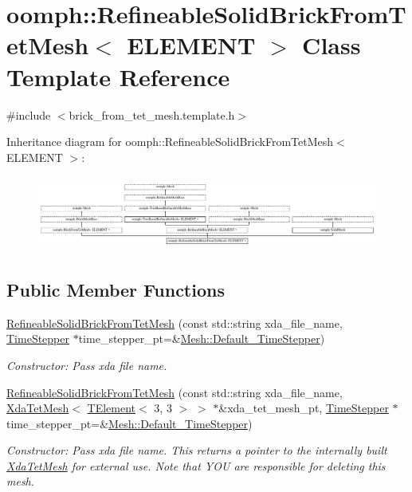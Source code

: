 \hypertarget{classoomph_1_1RefineableSolidBrickFromTetMesh}{}\section{oomph\+:\+:Refineable\+Solid\+Brick\+From\+Tet\+Mesh$<$ E\+L\+E\+M\+E\+NT $>$ Class Template Reference}
\label{classoomph_1_1RefineableSolidBrickFromTetMesh}


{\ttfamily \#include $<$brick\+\_\+from\+\_\+tet\+\_\+mesh.\+template.\+h$>$}

Inheritance diagram for oomph\+:\+:Refineable\+Solid\+Brick\+From\+Tet\+Mesh$<$ E\+L\+E\+M\+E\+NT $>$\+:\begin{figure}[H]
\begin{center}
\leavevmode
\includegraphics[height=2.477876cm]{classoomph_1_1RefineableSolidBrickFromTetMesh}
\end{center}
\end{figure}
\subsection*{Public Member Functions}
\begin{DoxyCompactItemize}
\item 
\hyperlink{classoomph_1_1RefineableSolidBrickFromTetMesh_a21676e62a225b6d698af7a58de4e3553}{Refineable\+Solid\+Brick\+From\+Tet\+Mesh} (const std\+::string xda\+\_\+file\+\_\+name, \hyperlink{classoomph_1_1TimeStepper}{Time\+Stepper} $\ast$time\+\_\+stepper\+\_\+pt=\&\hyperlink{classoomph_1_1Mesh_a12243d0fee2b1fcee729ee5a4777ea10}{Mesh\+::\+Default\+\_\+\+Time\+Stepper})
\begin{DoxyCompactList}\small\item\em Constructor\+: Pass xda file name. \end{DoxyCompactList}\item 
\hyperlink{classoomph_1_1RefineableSolidBrickFromTetMesh_a178ef2547dfaa31b2f88e50b26315d00}{Refineable\+Solid\+Brick\+From\+Tet\+Mesh} (const std\+::string xda\+\_\+file\+\_\+name, \hyperlink{classoomph_1_1XdaTetMesh}{Xda\+Tet\+Mesh}$<$ \hyperlink{classoomph_1_1TElement}{T\+Element}$<$ 3, 3 $>$ $>$ $\ast$\&xda\+\_\+tet\+\_\+mesh\+\_\+pt, \hyperlink{classoomph_1_1TimeStepper}{Time\+Stepper} $\ast$time\+\_\+stepper\+\_\+pt=\&\hyperlink{classoomph_1_1Mesh_a12243d0fee2b1fcee729ee5a4777ea10}{Mesh\+::\+Default\+\_\+\+Time\+Stepper})
\begin{DoxyCompactList}\small\item\em Constructor\+: Pass xda file name. This returns a pointer to the internally built \hyperlink{classoomph_1_1XdaTetMesh}{Xda\+Tet\+Mesh} for external use. Note that Y\+OU are responsible for deleting this mesh. \end{DoxyCompactList}\end{DoxyCompactItemize}
